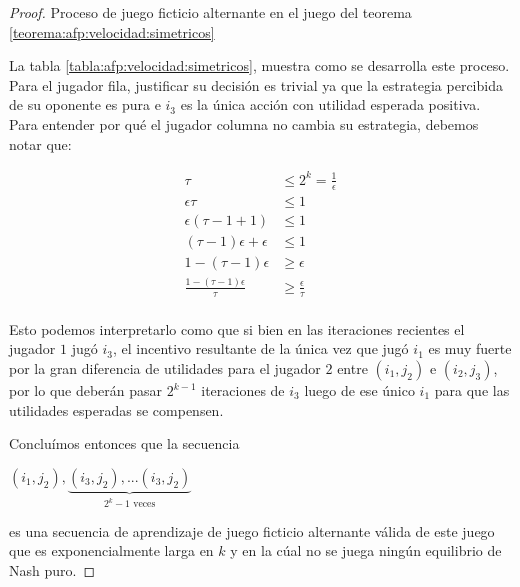 \begin{proof}
    \begin{table}
        
        \caption{Proceso de juego ficticio alternante en el juego del teorema \ref{teorema:afp:velocidad:simetricos}}
        \label{tabla:afp:velocidad:simetricos}
    \end{table}

    La tabla \ref{tabla:afp:velocidad:simetricos}, muestra como se desarrolla este proceso. Para el jugador fila, justificar su decisión es trivial ya que la estrategia percibida de su oponente es pura e $i_3$ es la única acción con utilidad esperada positiva. Para entender por qué el jugador columna no cambia su estrategia, debemos notar que:

    \begin{align*}
        \tau &\le 2^k = \frac{1}{\epsilon} \\
        \epsilon \tau&\le 1 \\
        \epsilon (\tau - 1 + 1) &\le 1\\
        (\tau - 1) \epsilon + \epsilon &\le 1\\
        1-(\tau-1)\epsilon &\ge \epsilon \\
        \frac{1-(\tau-1)\epsilon}{\tau} &\ge \frac{\epsilon}{\tau} \\
    \end{align*}

    Esto podemos interpretarlo como que si bien en las iteraciones recientes el jugador $1$ jugó $i_3$, el incentivo resultante de la única vez que jugó $i_1$ es muy fuerte por la gran diferencia de utilidades para el jugador $2$ entre $(i_1, j_2)$ e $(i_2, j_3)$, por lo que deberán pasar $2^{k-1}$ iteraciones de $i_3$ luego de ese único $i_1$ para que las utilidades esperadas se compensen.

    Concluímos entonces que la secuencia

    \begin{center}
    \begin{math}
        (i_1, j_2), \underbrace{(i_3, j_2), ... (i_3, j_2)}_{\text{$2^k - 1$ veces}}
    \end{math}
    \end{center}

    es una secuencia de aprendizaje de juego ficticio alternante válida de este juego que es exponencialmente larga en $k$ y en la cúal no se juega ningún equilibrio de Nash puro.

\end{proof}

